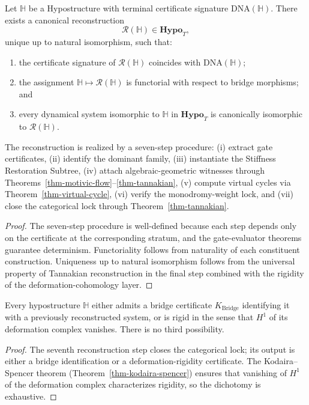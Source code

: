 \begin{theorem}\label{thm-structural-reconstruction}
Let $\mathbb H$ be a Hypostructure with terminal certificate signature $\mathrm{DNA}(\mathbb H)$. There exists a canonical reconstruction
\[
\mathcal R(\mathbb H) \in \mathbf{Hypo}_T,
\]
unique up to natural isomorphism, such that:
\begin{enumerate}
\item the certificate signature of $\mathcal R(\mathbb H)$ coincides with $\mathrm{DNA}(\mathbb H)$;
\item the assignment $\mathbb H \mapsto \mathcal R(\mathbb H)$ is functorial with respect to bridge morphisms; and
\item every dynamical system isomorphic to $\mathbb H$ in $\mathbf{Hypo}_T$ is canonically isomorphic to $\mathcal R(\mathbb H)$.
\end{enumerate}
The reconstruction is realized by a seven-step procedure: (i) extract gate certificates, (ii) identify the dominant family, (iii) instantiate the Stiffness Restoration Subtree, (iv) attach algebraic-geometric witnesses through Theorems~\ref{thm-motivic-flow}--\ref{thm-tannakian}, (v) compute virtual cycles via Theorem~\ref{thm-virtual-cycle}, (vi) verify the monodromy-weight lock, and (vii) close the categorical lock through Theorem~\ref{thm-tannakian}.
\end{theorem}

\begin{proof}
The seven-step procedure is well-defined because each step depends only on the certificate at the corresponding stratum, and the gate-evaluator theorems guarantee determinism. Functoriality follows from naturality of each constituent construction. Uniqueness up to natural isomorphism follows from the universal property of Tannakian reconstruction in the final step combined with the rigidity of the deformation-cohomology layer.
\end{proof}

\begin{corollary}\label{cor-bridge-rigidity}
Every hypostructure $\mathbb H$ either admits a bridge certificate $K_{\mathrm{Bridge}}$ identifying it with a previously reconstructed system, or is rigid in the sense that $H^1$ of its deformation complex vanishes. There is no third possibility.
\end{corollary}

\begin{proof}
The seventh reconstruction step closes the categorical lock; its output is either a bridge identification or a deformation-rigidity certificate. The Kodaira--Spencer theorem (Theorem~\ref{thm-kodaira-spencer}) ensures that vanishing of $H^1$ of the deformation complex characterizes rigidity, so the dichotomy is exhaustive.
\end{proof}


